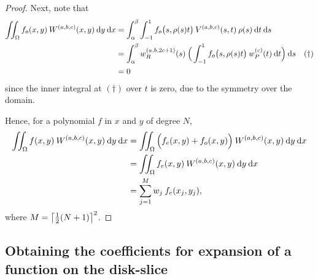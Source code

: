 \documentclass[11pt, oneside]{article}   	%
\newcommand{\half}{\frac{1}{2}}
\newcommand{\genjac}{R}
\newcommand{\genjacw}{w_\genjac}
\newcommand{\jacw}{w_P}
\newcommand{\Wabc}{{W^{(a,b,c)}}}
\begin{document}
\begin{proof}
Next, note that 
\begin{align*}
	\iint_\Omega f_o(x,y) \: \Wabc(x,y) \: \D y \: \D x &= \int_\alpha^\beta \int_{-1}^1 f_o\big(s,\rho(s) t\big) \: V^{(a,b,c)}(s,t) \: \rho(s) \: \D t \: \D s \\
	&= \int_\alpha^\beta  \genjacw^{(a,b,2c+1)}(s) \: \Big( \int_{-1}^1 f_o\big(s,\rho(s) t\big) \: \jacw^{(c)}(t) \: \D t \Big) \: \D s \quad (\dagger) \\
	&= 0
\end{align*}
since the inner integral at $(\dagger)$ over $t$ is zero, due to the symmetry over the domain.

Hence, for a polynomial $f$ in $x$ and $y$ of degree $N$,
\begin{align*}
	\iint_\Omega f(x,y) \: \Wabc(x,y) \: \D y \: \D x &= \iint_\Omega \Big(f_e(x,y) + f_o(x,y)\Big) \: \Wabc(x,y) \: \D y \: \D x \\
	&= \iint_\Omega f_e(x,y) \: \Wabc(x,y) \: \D y \: \D x \\
	&= \sum_{j=1}^{M}  w_j \: f_e(x_j, y_j),
\end{align*}
where $M = \ceil{\half(N+1)}^2$.
\end{proof}

\subsection{Obtaining the coefficients for expansion of a function on the disk-slice}
\end{document}
